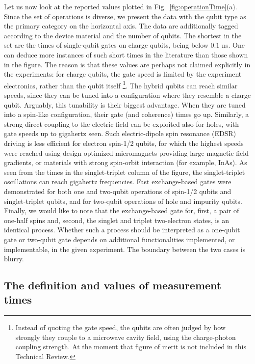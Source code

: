 \documentclass[aps, prx, showpacs, twocolumn, superscriptaddress, notitlepage, longbibliography, floatfix, nofootinbib]{revtex4-2}
\newcommand{\recheck}[1]{{#1}}
\begin{document}
Let us now look at the reported values plotted in Fig.~\ref{fig:operationTime}(a). Since the set of operations is diverse, we present the data with the qubit type as the primary category on the horizontal axis. The data are additionally tagged according to the device material and the number of qubits. \recheck{The shortest in the set are the times of single-qubit gates on charge qubits, being below $0.1$ ns.} One can deduce more instances of such short times in the literature than those shown in the figure. The reason is that these values are perhaps not claimed explicitly in the experiments: for charge qubits, the gate speed is limited by the experiment electronics, rather than the qubit itself \footnote{Instead of quoting the gate speed, the qubits are often judged by how strongly they couple to a microwave cavity field, using the charge-photon coupling strength. At the moment that figure of merit is not included in this Technical Review.}. \recheck{The hybrid qubits can reach similar speeds,} since they can be tuned into a configuration where they resemble a charge qubit. Arguably, this tunability is their biggest advantage. When they are tuned into a spin-like configuration, their gate (and coherence) times go up. Similarly, a strong direct coupling to the electric field can be exploited also for \recheck{holes, with gate speeds up to gigahertz seen}. Such electric-dipole spin resonance (EDSR) driving is less efficient for electron spin-1/2 qubits, for which \recheck{the highest speeds were reached using design-optimized micromagnets providing large magnetic-field gradients, or materials with strong spin-orbit interaction (for example, InAs).} As seen from the times in the singlet-triplet column of the figure, the singlet-triplet oscillations can reach gigahertz frequencies. Fast exchange-based gates were demonstrated for both one and two-qubit operations of spin-1/2 qubits and singlet-triplet qubits, and for two-qubit operations of hole and impurity qubits. Finally, we would like to note that the exchange-based gate for, first, a pair of one-half spins and, second, the singlet and triplet two-electron states, is an identical process. Whether such a process should be interpreted as a one-qubit gate or two-qubit gate depends on additional functionalities implemented, or implementable, in the given experiment. The boundary between the two cases is blurry. 

\subsection{The definition and values of measurement times}
\end{document}
